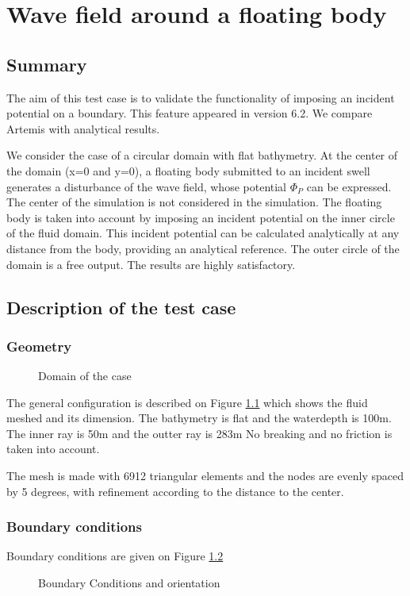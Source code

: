\chapter{Wave field around a floating body}
\section{Summary}
The aim of this test case is to validate the functionality of imposing an
incident potential on a boundary. This feature appeared in version 6.2.
We compare Artemis with analytical results.

We consider the case of a circular domain with flat bathymetry. At the center
of the domain (x=0 and y=0), a floating body submitted to an incident swell
generates a disturbance of the wave field, whose potential $\Phi_P$  can be
expressed. The center of the simulation is not considered in the simulation.
The floating body is taken into account by imposing an incident potential on
the inner circle of the fluid domain. This incident potential can be calculated
analytically at any distance from the body, providing an analytical reference.
The outer circle of the domain is a free output. The results are highly
satisfactory.

\section{Description of the test case}
\subsection{Geometry}

\begin{figure}[h]
\begin{center}
\end{center}
\caption{Domain of the case}
\label{fig:kochin_Mesh}
\end{figure}
The general configuration is described on Figure \ref{fig:kochin_Mesh} which
shows the fluid meshed and its dimension. The bathymetry is flat and the
waterdepth is 100m. The inner ray is 50m and the outter ray is 283m
No breaking and no friction is taken into account. 

The mesh is made with 6912 triangular elements and the nodes are evenly spaced
by 5 degrees, with refinement according to the distance to the center.

\subsection{Boundary conditions}
Boundary conditions are given on Figure \ref{fig:kochin_bc}
\begin{figure}[h]
\begin{center}
\end{center}
\caption{Boundary Conditions and orientation}
\label{fig:kochin_bc}
\end{figure}

